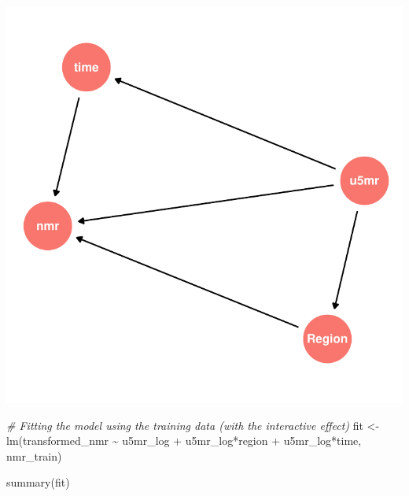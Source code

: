 \documentclass[
]{article}
\newenvironment{Shaded}{\begin{snugshade}}{\end{snugshade}}
\newcommand{\CommentTok}[1]{\textcolor[rgb]{0.56,0.35,0.01}{\textit{#1}}}
\newcommand{\FunctionTok}[1]{\textcolor[rgb]{0.00,0.00,0.00}{#1}}
\newcommand{\NormalTok}[1]{#1}
\newcommand{\OtherTok}[1]{\textcolor[rgb]{0.56,0.35,0.01}{#1}}
\newcommand{\SpecialCharTok}[1]{\textcolor[rgb]{0.00,0.00,0.00}{#1}}
\begin{document}
\includegraphics{A2_files/figure-latex/unnamed-chunk-3-1.pdf}

\begin{Shaded}
\begin{Highlighting}[]
\CommentTok{\# Fitting the model using the training data (with the interactive effect)}
\NormalTok{fit }\OtherTok{\textless{}{-}} \FunctionTok{lm}\NormalTok{(transformed\_nmr }\SpecialCharTok{\textasciitilde{}}\NormalTok{ u5mr\_log }\SpecialCharTok{+}\NormalTok{ u5mr\_log}\SpecialCharTok{*}\NormalTok{region }\SpecialCharTok{+}\NormalTok{ u5mr\_log}\SpecialCharTok{*}\NormalTok{time, nmr\_train)}

\FunctionTok{summary}\NormalTok{(fit)}
\end{Highlighting}
\end{Shaded}
\end{document}
